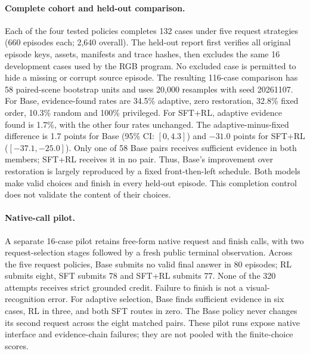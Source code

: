

\paragraph{Complete cohort and held-out comparison.}
Each of the four tested policies completes 132 cases under five request strategies (660 episodes each; 2,640 overall).
The held-out report first verifies all original episode keys, assets, manifests and trace hashes, then excludes the same 16 development cases used by the RGB program.
No excluded case is permitted to hide a missing or corrupt source episode.
The resulting 116-case comparison has 58 paired-scene bootstrap units and uses 20,000 resamples with seed 20261107.
For Base, evidence-found rates are 34.5\% adaptive, zero restoration, 32.8\% fixed order, 10.3\% random and 100\% privileged.
For SFT+RL, adaptive evidence found is 1.7\%, with the other four rates unchanged.
The adaptive-minus-fixed difference is 1.7 points for Base (95\% CI: $[0,4.3]$) and $-31.0$ points for SFT+RL ($[-37.1,-25.0]$).
Only one of 58 Base pairs receives sufficient evidence in both members; SFT+RL receives it in no pair.
Thus, Base's improvement over restoration is largely reproduced by a fixed front-then-left schedule.
Both models make valid choices and finish in every held-out episode.
This completion control does not validate the content of their choices.

\paragraph{Native-call pilot.}
A separate 16-case pilot retains free-form native request and finish calls, with two request-selection stages followed by a fresh public terminal observation.
Across the five request policies, Base submits no valid final answer in 80 episodes; RL submits eight, SFT submits 78 and SFT+RL submits 77.
None of the 320 attempts receives strict grounded credit.
Failure to finish is not a visual-recognition error.
For adaptive selection, Base finds sufficient evidence in six cases, RL in three, and both SFT routes in zero.
The Base policy never changes its second request across the eight matched pairs.
These pilot runs expose native interface and evidence-chain failures; they are not pooled with the finite-choice scores.


